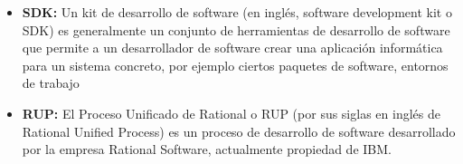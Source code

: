 \begin{itemize}
 \item \textbf{SDK:} Un kit de desarrollo de software (en inglés, software development kit o SDK) es generalmente un conjunto de herramientas de desarrollo de software que permite a un desarrollador de software crear una aplicación informática para un sistema concreto, por ejemplo ciertos paquetes de software, entornos de trabajo
 \item \textbf{RUP:} El Proceso Unificado de Rational o RUP (por sus siglas en inglés de Rational Unified Process) es un proceso de desarrollo de software desarrollado por la empresa Rational Software, actualmente propiedad de IBM.
\end{itemize}